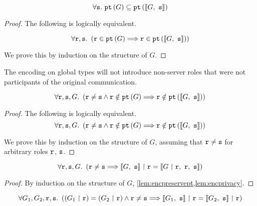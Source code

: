 \begin{lemma}[???]
\[
\forall {\mathtt{s}}. ~ {\textnormal{\texttt{pt}}\left({G}\right)} \subseteq {\textnormal{\texttt{pt}}\left({ \llbracket {G},~ {\mathtt{s}}  \rrbracket }\right)}
\]
\label{lem:encpreservept}
\end{lemma}

\begin{proof}
The following is logically equivalent.

\[
\forall {\mathtt{r}}, {\mathtt{s}}. ~ \left(
{\mathtt{r}} \in {\textnormal{\texttt{pt}}\left({G}\right)} \Longrightarrow {\mathtt{r}} \in {\textnormal{\texttt{pt}}\left({ \llbracket {G},~ {\mathtt{s}}  \rrbracket }\right)}
\right)
\]

We prove this by induction on the structure of $G$.
\end{proof}

\begin{lemma}
The encoding on global types will not introduce
non-server roles that were not participants of the 
original communication.

\[
\forall {\mathtt{r}}, {\mathtt{s}}, G. ~ \left(
{\mathtt{r}} \neq {\mathtt{s}} \wedge {\mathtt{r}} \notin {\textnormal{\texttt{pt}}\left({G}\right)}
\Longrightarrow {\mathtt{r}} \notin {\textnormal{\texttt{pt}}\left({ \llbracket {G},~ {\mathtt{s}}  \rrbracket }\right)}
\right)
\]
\label{lem:encprivacy}
\end{lemma}

\begin{proof}
The following is logically equivalent.
\[
\forall {\mathtt{r}}, {\mathtt{s}}, G. ~ \left(
{\mathtt{r}} \neq {\mathtt{s}} \wedge {\mathtt{r}} \notin {\textnormal{\texttt{pt}}\left({G}\right)}
\Longrightarrow {\mathtt{r}} \notin {\textnormal{\texttt{pt}}\left({ \llbracket {G},~ {\mathtt{s}}  \rrbracket }\right)}
\right)
\]

We prove this by induction on the structure of $G$,
assuming that ${\mathtt{r}} \neq {\mathtt{s}}$ for arbitrary
roles ${\mathtt{r}}$, ${\mathtt{s}}$.
\end{proof}

\begin{lemma}

\[
\forall {\mathtt{r}}, {\mathtt{s}}, G. ~ \left(
{\mathtt{r}} \neq {\mathtt{s}} 
	\Longrightarrow
{ \llbracket {G},~ {\mathtt{s}}  \rrbracket } \upharpoonright {\mathtt{r}} = \llbracket { {G} \upharpoonright {\mathtt{r}}  },~{\mathtt{r}},~{\mathtt{s}} \rrbracket
\right)
\]

\label{lem:enclink}
\end{lemma}

\begin{proof}
By induction on the structure of $G$,
\cref{lem:encpreservept,lem:encprivacy}.
\end{proof}

\begin{lemma}
\[
\forall G_1, G_2, {\mathtt{r}}, {\mathtt{s}}. ~ \left(
({G_1} \upharpoonright {\mathtt{r}}) = ({G_2} \upharpoonright {\mathtt{r}}) \wedge {\mathtt{r}} \neq {\mathtt{s}}
	\Longrightarrow
{ \llbracket {G_1},~ {\mathtt{s}}  \rrbracket } \upharpoonright {\mathtt{r}} = {\llbracket {G_2},~{\mathtt{s}} \rrbracket} \upharpoonright {\mathtt{r}}
\right)
\]

\label{lem:encprojeq}
\end{lemma}

